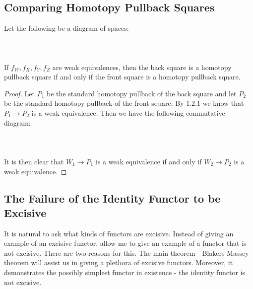 \documentclass[a4paper]{article}
\begin{document}
\subsection{Comparing Homotopy Pullback Squares}
\begin{prp}{}{} Let the following be a diagram of spaces: \\~\\
\\~\\
If $f_W,f_X,f_Y,f_Z$ are weak equivalences, then the back square is a homotopy pullback square if and only if the front square is a homotopy pullback square. \tcbline
\begin{proof}
Let $P_1$ be the standard homotopy pullback of the back square and let $P_2$ be the standard homotopy pullback of the front square. By 1.2.1 we know that $P_1\to P_2$ is a weak equivalence. Then we have the following commutative diagram: \\~\\
\\~\\
It is then clear that $W_1\to P_1$ is a weak equivalence if and only if $W_2\to P_2$ is a weak equivalence.  
\end{proof}
\end{prp}

\subsection{The Failure of the Identity Functor to be Excisive}
It is natural to ask what kinds of functors are excisive. Instead of giving an example of an excisive functor, allow me to give an example of a functor that is not excisive. There are two reasons for this. The main theorem - Blakers-Massey theorem will assist us in giving a plethora of excisive functors. Moreover, it demonstrates the possibly simplest functor in existence - the identity functor is not excisive. \\~\\
\end{document}
